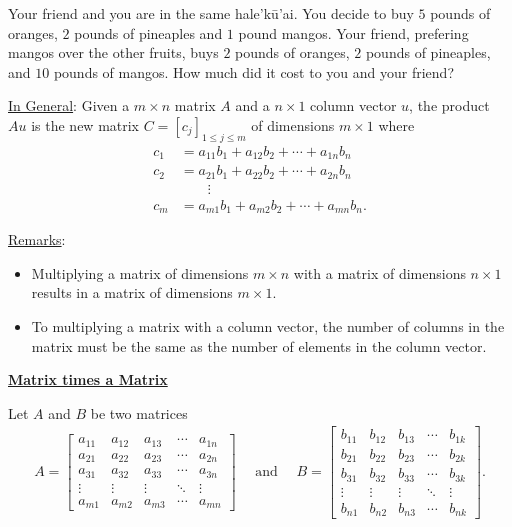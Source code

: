 \documentclass[12pt,a4paper]{article}
\newcounter{example}[section]
\begin{document}
	\vspace*{12pt}
	
	\begin{example}
	Your friend and you are in the same hale'kū'ai. You decide to buy $5$ pounds of oranges, $2$ pounds of pineaples and $1$ pound mangos. Your friend, prefering mangos over the other fruits, buys $2$ pounds of oranges, $2$ pounds of pineaples, and $10$ pounds of mangos. How much did it cost to you and your friend?
	\end{example}
	
	\vfill
	
	\noindent\underline{In General}: Given a $m \times n$ matrix $A$ and a $n \times 1$ column vector $u$, the product $Au$ is the new matrix $C = [c_j]_{1 \leq j \leq m}$ of dimensions $m \times 1$ where
		\begin{align*}
		c_1 &= a_{11} b_1 + a_{12} b_2 + \cdots + a_{1n} b_n \\
		c_2 &= a_{21} b_1 + a_{22} b_2 + \cdots + a_{2n} b_n \\
		& \qquad \vdots \\
		c_m &= a_{m1} b_1 + a_{m2} b_2 + \cdots + a_{mn} b_n .
		\end{align*}
		
	\noindent\underline{Remarks}:
		\begin{itemize}
		\item Multiplying a matrix of dimensions $m \times n$ with a matrix of dimensions $n \times 1$ results in a matrix of dimensions $m \times 1$.
		\item To multiplying a matrix with a column vector, the number of columns in the matrix must be the same as the number of elements in the column vector.
		\end{itemize}
	
\newpage

	\noindent\underline{\textbf{Matrix times a Matrix}}
	
	\vspace*{12pt}
	
	\noindent Let $A$ and $B$ be two matrices
		\begin{align*}
		A = \begin{bmatrix}
		a_{11} & a_{12} & a_{13} & \cdots & a_{1n} \\
		a_{21} & a_{22} & a_{23} & \cdots & a_{2n} \\
		a_{31} & a_{32} & a_{33} & \cdots & a_{3n} \\
		\vdots & \vdots & \vdots & \ddots & \vdots \\
		a_{m1} & a_{m2} & a_{m3} & \cdots & a_{mn}
		\end{bmatrix} 
		\quad \text{ and } \quad
		B = \begin{bmatrix}
		b_{11} & b_{12} & b_{13} & \cdots & b_{1k} \\
		b_{21} & b_{22} & b_{23} & \cdots & b_{2k} \\
		b_{31} & b_{32} & b_{33} & \cdots & b_{3k} \\
		\vdots & \vdots & \vdots & \ddots & \vdots \\
		b_{n1} & b_{n2} & b_{n3} & \cdots & b_{nk}
		\end{bmatrix} .
		\end{align*}
		
\end{document}
